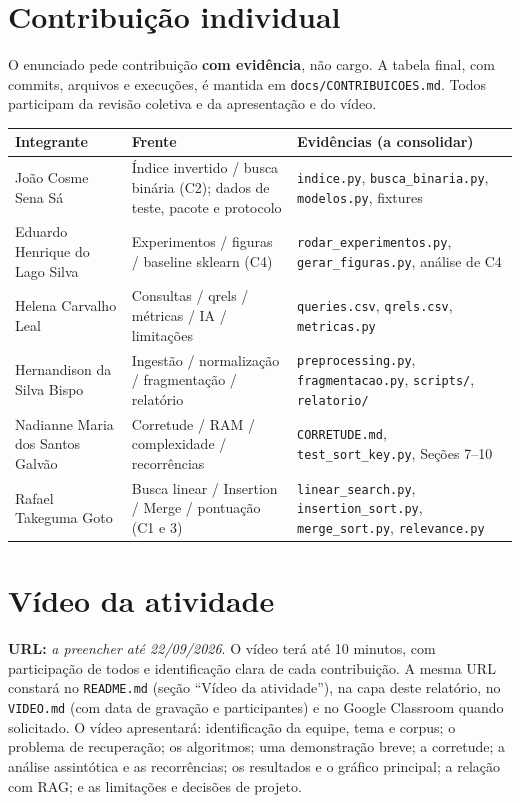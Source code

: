 \documentclass[11pt,a4paper]{article}
\begin{document}
\section{Contribuição individual}\label{sec:contrib}
O enunciado pede contribuição \textbf{com evidência}, não cargo. A tabela final, com commits,
arquivos e execuções, é mantida em \texttt{docs/CONTRIBUICOES.md}. Todos participam da revisão
coletiva e da apresentação e do vídeo.
\begin{table}[h]
\small\centering
\begin{tabularx}{\textwidth}{@{}p{5cm}p{4.2cm}Y@{}}
\toprule
\textbf{Integrante} & \textbf{Frente} & \textbf{Evidências (a consolidar)}\\
\midrule
João Cosme Sena Sá & Índice invertido / busca binária (C2); dados de teste, pacote e protocolo & \texttt{indice.py}, \texttt{busca\_binaria.py}, \texttt{modelos.py}, fixtures\\
Eduardo Henrique do Lago Silva & Experimentos / figuras / baseline sklearn (C4) & \texttt{rodar\_experimentos.py}, \texttt{gerar\_figuras.py}, análise de C4\\
Helena Carvalho Leal & Consultas / qrels / métricas / IA / limitações & \texttt{queries.csv}, \texttt{qrels.csv}, \texttt{metricas.py}\\
Hernandison da Silva Bispo & Ingestão / normalização / fragmentação / relatório & \texttt{preprocessing.py}, \texttt{fragmentacao.py}, \texttt{scripts/}, \texttt{relatorio/}\\
Nadianne Maria dos Santos Galvão & Corretude / RAM / complexidade / recorrências & \texttt{CORRETUDE.md}, \texttt{test\_sort\_key.py}, Seções 7--10\\
Rafael Takeguma Goto & Busca linear / Insertion / Merge / pontuação (C1 e 3) & \texttt{linear\_search.py}, \texttt{insertion\_sort.py}, \texttt{merge\_sort.py}, \texttt{relevance.py}\\
\bottomrule
\end{tabularx}
\end{table}

\section{Vídeo da atividade}
\textbf{URL:} \emph{a preencher até 22/09/2026}. O vídeo terá até 10 minutos, com participação de
todos e identificação clara de cada contribuição. A mesma URL constará no \texttt{README.md} (seção
``Vídeo da atividade''), na capa deste relatório, no \texttt{VIDEO.md} (com data de gravação e
participantes) e no Google Classroom quando solicitado. O vídeo apresentará: identificação da equipe,
tema e corpus; o problema de recuperação; os algoritmos; uma demonstração breve; a corretude; a
análise assintótica e as recorrências; os resultados e o gráfico principal; a relação com RAG; e as
limitações e decisões de projeto.
\end{document}
